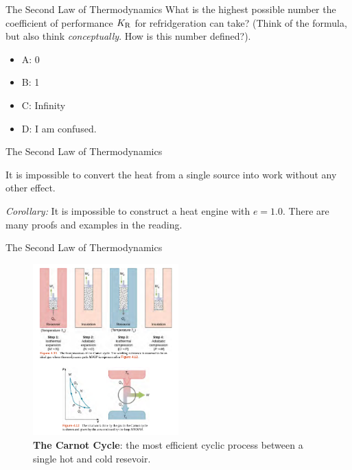 \documentclass{beamer}
\begin{document}
\begin{frame}{The Second Law of Thermodynamics}
What is the highest possible number the coefficient of performance $K_{\rm R}$ for refridgeration can take?  (Think of the formula, but also think \textit{conceptually}.  How is this number defined?).
\begin{itemize}
\item A: 0
\item B: 1
\item C: Infinity
\item D: I am confused.
\end{itemize}
\end{frame}

\begin{frame}{The Second Law of Thermodynamics}
\begin{tcolorbox}[colback=white,colframe=red!40!blue,title=The \textit{Kelvin Statement} of the Second Law of Thermodynamics]
\alert{It is impossible to convert the heat from a single source into work without any other effect.}
\end{tcolorbox}
\textit{Corollary:} It is impossible to construct a heat engine with $e=1.0$.  There are many proofs and examples in the reading.
\end{frame}

\begin{frame}{The Second Law of Thermodynamics}
\begin{figure}
\centering
\includegraphics[width=0.5\textwidth]{figures/carnot1.png}
\caption{\label{fig:carnot2} \textbf{The Carnot Cycle}: the most efficient cyclic process between a single hot and cold resevoir.}
\end{figure}
\end{frame}
\end{document}
